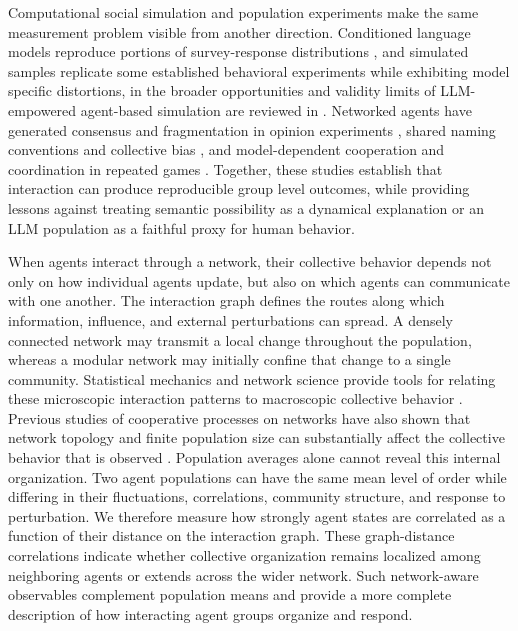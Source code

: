 \documentclass[12pt]{article}
\begin{document}
Computational social simulation and population experiments make the same
measurement problem visible from another direction.  Conditioned language
models reproduce portions of survey-response distributions
\cite{argyle2023}, and simulated samples replicate some established behavioral
experiments while exhibiting model specific distortions, in \cite{aher2023} the
broader opportunities and validity limits of LLM-empowered agent-based
simulation are reviewed in \cite{gao2024abm}.  Networked agents have generated
consensus and fragmentation in opinion experiments \cite{chuang2024}, shared
naming conventions and collective bias \cite{flintashery2025}, and
model-dependent cooperation and coordination in repeated games
\cite{akata2025}.  Together, these studies establish that interaction can
produce reproducible group level outcomes, while providing lessons against treating
semantic possibility as a dynamical explanation or an LLM population as a
faithful proxy for human behavior.

When agents interact through a network, their collective behavior depends not
only on how individual agents update, but also on which agents can communicate
with one another. The interaction graph defines the routes along which
information, influence, and external perturbations can spread. A densely
connected network may transmit a local change throughout the population,
whereas a modular network may initially confine that change to a single
community. Statistical mechanics and network science provide tools for
relating these microscopic interaction patterns to macroscopic collective
behavior \cite{albert2002,boccaletti2006}. Previous studies of cooperative
processes on networks have also shown that network topology and finite
population size can substantially affect the collective behavior that is
observed \cite{dorogovtsev2008}.
Population averages alone cannot reveal this internal organization. Two agent
populations can have the same mean level of order while differing in their
fluctuations, correlations, community structure, and response to perturbation.
We therefore measure how strongly agent states are correlated as a function of
their distance on the interaction graph. These graph-distance correlations
indicate whether collective organization remains localized among neighboring
agents or extends across the wider network. Such network-aware observables
complement population means and provide a more complete description of how
interacting agent groups organize and respond.
\end{document}
